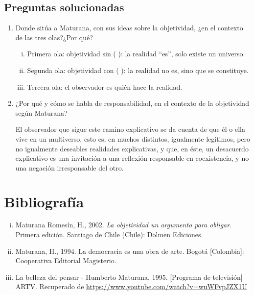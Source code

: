 \documentclass[10pt]{article}
\begin{document}
    \subsection{Preguntas solucionadas}
        \begin{enumerate}
            \item  Donde sitúa a Maturana, con sus ideas sobre la objetividad, ¿en el contexto de las tres olas?¿Por qué?
            \begin{enumerate}[i.]
                \item Primera ola: objetividad sin ( ): la realidad “es”, solo existe un universo.
                \item Segunda ola: objetividad con ( ): la realidad no es, sino que se constituye.
                \item Tercera ola: el observador es quién hace la realidad.
            \end{enumerate}
            
            \item ¿Por qué y cómo se habla de responsabilidad, en el contexto de la objetividad según Maturana?
            
            El observador que sigue este camino explicativo se da cuenta de que él o ella vive en un multiverso, esto es, en muchos distintos, igualmente legítimos, pero no igualmente deseables realidades explicativas, y que, en éste, un desacuerdo explicativo es una invitación a una reflexión responsable en coexistencia, y no una negación irresponsable del otro.

        \end{enumerate}

    \section{Bibliografía}
\begin{enumerate}[i.]
    \item Maturana Romesín, H., 2002. \textit{La objetividad un argumento para obligar}. Primera edición. Santiago de Chile (Chile): Dolmen Ediciones.
    \item Maturana, H., 1994. La democracia es una obra de arte. Bogotá [Colombia]: Cooperativa Editorial Magisterio.
    \item La belleza del pensar - Humberto Maturana, 1995. [Programa de televisión] ARTV. Recuperado de \url{https://www.youtube.com/watch?v=wuWFvpJZX1U}

\end{enumerate}
\end{document}
